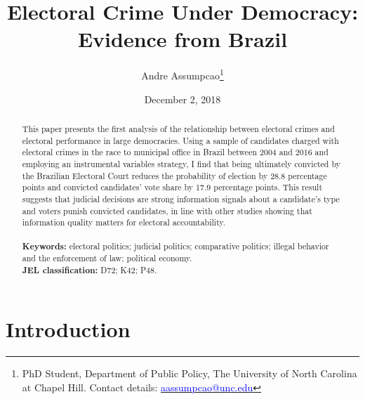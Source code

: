 \documentclass[11pt]{article}
\begin{document}
\begin{titlepage}
\title{Electoral Crime Under Democracy: Evidence from Brazil}
\author{Andre Assumpcao\thanks{PhD Student, Department of Public Policy, The University of North Carolina at Chapel Hill. Contact details: \href{mailto:aassumpcao@unc.edu}{\textcolor{blue}{aassumpcao@unc.edu}}}}
\date{December 2, 2018}

\maketitle

\begin{abstract}
\noindent This paper presents the first analysis of the relationship between electoral crimes and electoral performance in large democracies. Using a sample of candidates charged with electoral crimes in the race to municipal office in Brazil between 2004 and 2016 and employing an instrumental variables strategy, I find that being ultimately convicted by the Brazilian Electoral Court reduces the probability of election by 28.8 percentage points and convicted candidates' vote share by 17.9 percentage points. This result suggests that judicial decisions are strong information signals about a candidate's type and voters punish convicted candidates, in line with other studies showing that information quality matters for electoral accountability. \\
\vspace{0in} \\
\noindent\textbf{Keywords:} electoral politics; judicial politics; comparative politics; illegal behavior and the enforcement of law; political economy. \\

\noindent\textbf{JEL classification:} D72; K42; P48. \\
\vspace{0in}
\bigskip

\end{abstract}

\setcounter{page}{0}

\thispagestyle{empty}

\end{titlepage}

\clearpage

\section{Introduction} \label{sec:introduction_paper1}
\end{document}
